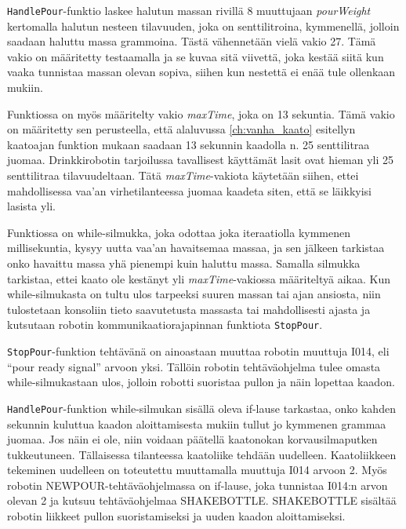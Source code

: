 \texttt{HandlePour}\hyp{}funktio laskee halutun massan rivillä 8 muuttujaan \textit{pourWeight} kertomalla halutun nesteen tilavuuden, joka on senttilitroina, kymmenellä, jolloin saadaan haluttu massa grammoina. Tästä vähennetään vielä vakio 27. Tämä vakio on määritetty testaamalla ja se kuvaa sitä viivettä, joka kestää siitä kun vaaka tunnistaa massan olevan sopiva, siihen kun nestettä ei enää tule ollenkaan mukiin.

Funktiossa on myös määritelty vakio \textit{maxTime}, joka on 13 sekuntia. Tämä vakio on määritetty sen perusteella, että alaluvussa \ref{ch:vanha_kaato} esitellyn kaatoajan funktion mukaan saadaan 13 sekunnin kaadolla n. 25 senttilitraa juomaa. Drinkkirobotin tarjoilussa tavallisest käyttämät lasit ovat hieman yli 25 senttilitraa tilavuudeltaan. Tätä \textit{maxTime}-vakiota käytetään siihen, ettei mahdollisessa vaa'an virhetilanteessa juomaa kaadeta siten, että se läikkyisi lasista yli.

Funktiossa on while-silmukka, joka odottaa joka iteraatiolla kymmenen millisekuntia, kysyy uutta vaa'an havaitsemaa massaa, ja sen jälkeen tarkistaa onko havaittu massa yhä pienempi kuin haluttu massa. Samalla silmukka tarkistaa, ettei kaato ole kestänyt yli \textit{maxTime}-vakiossa määriteltyä aikaa. Kun while-silmukasta on tultu ulos tarpeeksi suuren massan tai ajan ansiosta, niin tulostetaan konsoliin tieto saavutetusta massasta tai mahdollisesti ajasta ja kutsutaan robotin kommunikaatiorajapinnan funktiota \texttt{StopPour}.

\texttt{StopPour}-funktion tehtävänä on ainoastaan muuttaa robotin muuttuja I014, eli ``pour ready signal'' arvoon yksi. Tällöin robotin tehtäväohjelma tulee omasta while-silmukastaan ulos, jolloin robotti suoristaa pullon ja näin lopettaa kaadon.

\texttt{HandlePour}-funktion while-silmukan sisällä oleva if-lause tarkastaa, onko kahden sekunnin kuluttua kaadon aloittamisesta mukiin tullut jo kymmenen grammaa juomaa. Jos näin ei ole, niin voidaan päätellä kaatonokan korvausilmaputken tukkeutuneen. Tällaisessa tilanteessa kaatoliike tehdään uudelleen. Kaatoliikkeen tekeminen uudelleen on toteutettu muuttamalla muuttuja I014 arvoon 2. Myös robotin NEWPOUR-tehtäväohjelmassa on if-lause, joka tunnistaa I014:n arvon olevan 2 ja kutsuu tehtäväohjelmaa SHAKEBOTTLE. SHAKEBOTTLE sisältää robotin liikkeet pullon suoristamiseksi ja uuden kaadon aloittamiseksi.

\newpage

